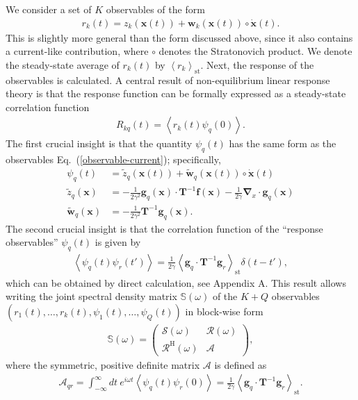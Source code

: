 \documentclass[aps,pre,twocolumn,superscriptaddress,notitlepage]{revtex4-2}
\newcommand{\Av}[1]{\left\langle #1 \right\rangle}
\newcommand{\nn}{\nonumber \\}
\newcommand{\n}{\nonumber}
\newcommand{\grad}{\bm{\nabla}}
\newcommand{\bmc}[1]{\bm{\mathcal{#1}}}
\renewcommand{\eqref}[1]{Eq.~(\ref{#1})}
\begin{document}
We consider a set of $K$ observables of the form
\begin{align}
r_k(t) = z_k(\bm{x}(t)) + \bm{w}_k(\bm{x}(t)) \circ \dot{\bm{x}}(t) \label{observable-current} .
\end{align}
This is slightly more general than the form discussed above, since it also contains a current-like contribution, where $\circ$ denotes the Stratonovich product.
We denote the steady-state average of $r_k(t)$ by $\Av{r_k}_\text{st}$.
Next, the response of the observables is calculated.
A central result of non-equilibrium linear response theory \cite{Agarwal1972,Haenggi1982a,Marconi2008,Baiesi2009,Seifert2010a} is that the response function can be formally expressed as a steady-state correlation function
\begin{align}
R_{k q}(t) = \Av{r_k(t) \psi_q(0)} .
\end{align}
The first crucial insight is that the quantity $\psi_q(t)$ has the same form as the observables \eqref{observable-current}; specifically,
\begin{align}
\psi_q(t) &= \tilde{z}_q(\bm{x}(t)) + \tilde{\bm{w}}_q(\bm{x}(t)) \circ \dot{\bm{x}}(t) \\
\tilde{z}_q(\bm{x}) &= - \frac{1}{2 \gamma^2} \bm{g}_q(\bm{x}) \cdot \bm{T}^{-1} \bm{f}(\bm{x}) - \frac{1}{2 \gamma} \grad_x \cdot \bm{g}_q(\bm{x}) \nn
\tilde{\bm{w}}_q(\bm{x}) &= -\frac{1}{2 \gamma^2} \bm{T}^{-1} \bm{g}_q(\bm{x}) \n .
\end{align}
The second crucial insight is that the correlation function of the \enquote{response observables} $\psi_q(t)$ is given by
\begin{align}
\Av{\psi_q(t) \psi_r(t')} = \frac{1}{2 \gamma} \Av{\bm{g}_q \cdot \bm{T}^{-1} \bm{g}_r}_\text{st} \delta(t-t') ,
\end{align}
which can be obtained by direct calculation, see Appendix A.
This result allows writing the joint spectral density matrix $\mathbb{S}(\omega)$ of the $K+Q$ observables $(r_1(t),\ldots,r_k(t),\psi_1(t),\ldots,\psi_Q(t))$ in block-wise form
\begin{align}
\mathbb{S}(\omega) = \begin{pmatrix} \bmc{S}(\omega) & \bmc{R}(\omega) \\ \bmc{R}^\text{H}(\omega) & \bmc{A} \end{pmatrix},
\end{align}
where the symmetric, positive definite matrix $\bmc{A}$ is defined as
\begin{align}
\mathcal{A}_{q r} = \int_{-\infty}^\infty dt \ e^{i \omega t} \Av{\psi_q(t) \psi_r(0)} = \frac{1}{2 \gamma} \Av{\bm{g}_q \cdot \bm{T}^{-1} \bm{g}_r}_\text{st} .
\end{align}
\end{document}
